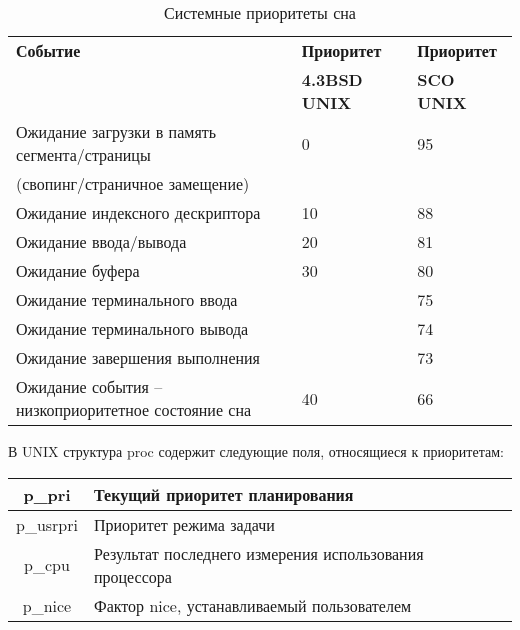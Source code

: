 \begin{table}[H]
    \centering
    \caption{Системные приоритеты сна}
    \begin{tabular}{|l|l|l|}
        \hline
        \textbf{Событие} & \textbf{Приоритет} & \textbf{Приоритет} \\
                         & \textbf{4.3BSD UNIX} & \textbf{SCO UNIX} \\
        \hline
        \hline
        Ожидание загрузки в память сегмента/страницы & 0 & 95 \\
        (свопинг/страничное замещение) & & \\
        \hline
        Ожидание индексного дескриптора & 10 & 88 \\
        \hline
        Ожидание ввода/вывода & 20 & 81 \\
        \hline
        Ожидание буфера & 30 & 80 \\
        \hline
        Ожидание терминального ввода & & 75 \\
        \hline
        Ожидание терминального вывода & & 74 \\
        \hline
        Ожидание завершения выполнения & & 73 \\
        \hline
        Ожидание события -- низкоприоритетное состояние сна & 40 & 66 \\
        \hline
    \end{tabular}
\end{table}

В UNIX структура proc содержит следующие поля, относящиеся к приоритетам:

\begin{table}[H]
    \centering
    \begin{tabular}{|c||l|}
        \hline
        {\ttfamily p\_pri} &
        Текущий приоритет планирования \\
        \hline
        {\ttfamily p\_usrpri} &
        Приоритет режима задачи \\
        \hline
        {\ttfamily p\_cpu} &
        Результат последнего измерения использования процессора \\
        \hline
        {\ttfamily p\_nice} &
        Фактор nice, устанавливаемый пользователем \\
        \hline
    \end{tabular}
\end{table}

